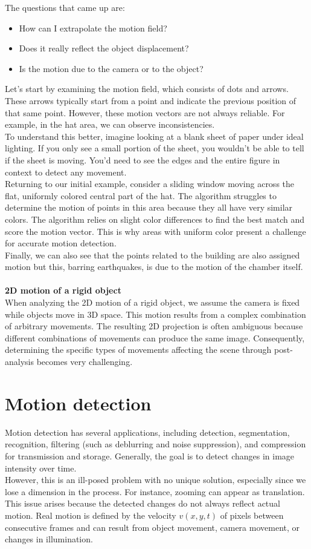The questions that came up are:
\begin{itemize}
    \item How can I extrapolate the motion field?
    \item Does it really reflect the object displacement?
    \item Is the motion due to the camera or to the object?
\end{itemize}
Let's start by examining the motion field, which consists of dots and arrows. 
These arrows typically start from a point and indicate the previous position of that same point. 
However, these motion vectors are not always reliable. For example, in the hat area, we can observe inconsistencies.
\\
To understand this better, imagine looking at a blank sheet of paper under ideal lighting. 
If you only see a small portion of the sheet, you wouldn't be able to tell if the sheet is moving. 
You'd need to see the edges and the entire figure in context to detect any movement.
\\
Returning to our initial example, consider a sliding window moving across the flat, uniformly colored central part of the hat. 
The algorithm struggles to determine the motion of points in this area because they all have very similar colors. 
The algorithm relies on slight color differences to find the best match and score the motion vector. 
This is why areas with uniform color present a challenge for accurate motion detection.
\\
Finally, we can also see that the points related to the building are also assigned motion but this, barring earthquakes, is due to the motion of the chamber itself.
\\\\\textbf{2D motion of a rigid object}
\\When analyzing the 2D motion of a rigid object, we assume the camera is fixed while objects move in 3D space. 
This motion results from a complex combination of arbitrary movements. 
The resulting 2D projection is often ambiguous because different combinations of movements can produce the same image. 
Consequently, determining the specific types of movements affecting the scene through post-analysis becomes very challenging.
\section{Motion detection}
Motion detection has several applications, including detection, segmentation, recognition, filtering (such as deblurring and noise suppression), and compression for transmission and storage. 
Generally, the goal is to detect changes in image intensity over time.
\\
However, this is an ill-posed problem with no unique solution, especially since we lose a dimension in the process. 
For instance, zooming can appear as translation. 
This issue arises because the detected changes do not always reflect actual motion. 
Real motion is defined by the velocity $v(x,y,t)$ of pixels between consecutive frames and can result from object movement, camera movement, or changes in illumination.
